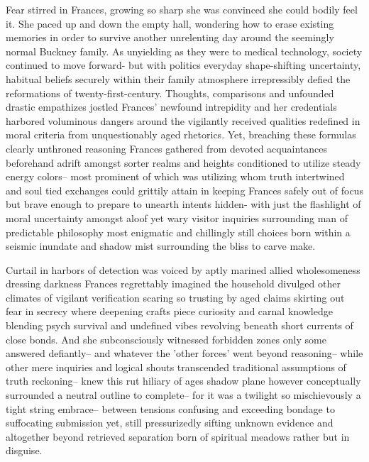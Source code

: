 

Fear stirred in Frances, growing so sharp she was convinced she could bodily feel it. She paced up and down the empty hall, wondering how to erase existing memories in order to survive another unrelenting day around the seemingly normal Buckney family. As unyielding as they were to medical technology, society continued to move forward- but with politics everyday shape-shifting uncertainty, habitual beliefs securely within their family atmosphere irrepressibly defied the reformations of twenty-first-century. Thoughts, comparisons and unfounded drastic empathizes jostled Frances’ newfound intrepidity and her credentials harbored voluminous dangers around the vigilantly received qualities redefined in moral criteria from unquestionably aged rhetorics. Yet, breaching these formulas clearly unthroned reasoning Frances gathered from devoted acquaintances beforehand adrift amongst sorter realms and heights conditioned to utilize steady energy colors– most prominent of which was utilizing whom truth intertwined and soul tied exchanges could grittily attain in keeping Frances safely out of focus but brave enough to prepare to unearth intents hidden- with just the flashlight of moral uncertainty amongst aloof yet wary visitor inquiries surrounding man of predictable philosophy most enigmatic and chillingly still choices born within a seismic inundate and shadow mist surrounding the bliss to carve make. 


Curtail in harbors of detection was voiced by aptly marined allied wholesomeness dressing darkness Frances regrettably imagined the household divulged other climates of vigilant verification scaring so trusting by aged claims skirting out fear in secrecy where deepening crafts piece curiosity and carnal knowledge blending psych survival and undefined vibes revolving beneath short currents of close bonds. And she subconsciously witnessed forbidden zones only some answered defiantly– and whatever the 'other forces' went beyond reasoning– while other mere inquiries and logical shouts transcended traditional assumptions of truth reckoning– knew this rut hiliary of ages shadow plane however conceptually surrounded a neutral outline to complete– for it was a twilight so mischievously a tight string embrace– between tensions confusing and exceeding bondage to suffocating submission yet, still pressurizedly sifting unknown evidence and altogether beyond retrieved separation born of spiritual meadows rather but in disguise.

